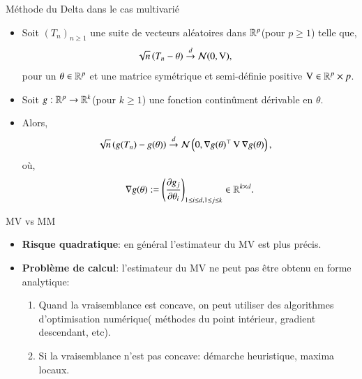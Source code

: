 \begin{frame}[allowframebreaks]{Méthode du Delta dans le cas multivarié}
\begin{itemize}
    \item Soit $(T_n)_{n\geq 1}$ une suite de vecteurs aléatoires dans $\mathbb{R}^p$(pour $p\geq 1$) telle que,\begin{align*}
        \sqrt{n}\left(T_n - \theta\right)&\overset{d}{\rightarrow}\mathcal{N}(0, \operatorname{V}),
    \end{align*}
    pour un $\theta \in \mathbb{R}^p$ et une matrice symétrique et semi-définie positive $\operatorname{V}\in \mathbb{R}^p\times p$.
    \item Soit $g: \mathbb{R}^p\rightarrow\mathbb{R}^k$(pour $k\geq 1$) une fonction continûment dérivable en $\theta$. 
    \item Alors,\begin{align*}
        \sqrt{n}\left(g(T_n) - g(\theta)\right) &\overset{d}{\rightarrow} 
        \mathcal{N}\left(0, \nabla g(\theta)^\top\operatorname{V} \nabla g(\theta)\right),
    \end{align*}
    où,\begin{align*}
        \nabla g(\theta) := \left(\frac{\partial g_j}{\partial \theta_i}\right)_{1\leq i\leq d,  1\leq j\leq k}\in\mathbb{R}^{k\times d}.
    \end{align*}
\end{itemize}    
\end{frame}
\begin{frame}
    [allowframebreaks]{MV vs MM}\begin{itemize}
        \item \textbf{Risque quadratique}: en général l'estimateur du MV est plus précis.
        \item \textbf{Problème de calcul}: l'estimateur du MV ne peut pas être obtenu en forme analytique: 
        \begin{enumerate}[-]
            \item Quand la vraisemblance est concave, on peut utiliser des algorithmes d'optimisation numérique(
                méthodes du point intérieur, gradient descendant, etc).
            \item Si la vraisemblance n'est pas concave: démarche heuristique, maxima locaux.
        \end{enumerate}
    \end{itemize}
\end{frame}

